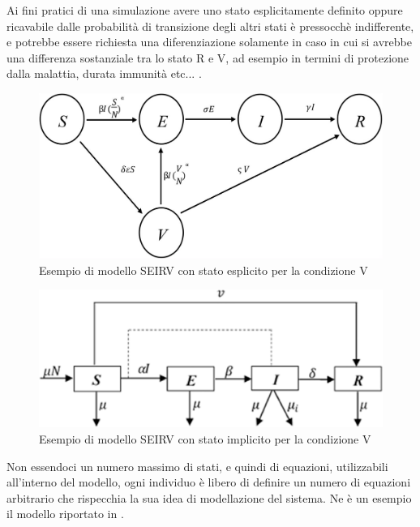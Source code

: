 Ai fini pratici di una simulazione avere uno stato esplicitamente definito
oppure ricavabile dalle probabilità di transizione degli altri stati 
è pressocchè indifferente, e potrebbe essere richiesta una diferenziazione
solamente in caso in cui si avrebbe una differenza sostanziale tra lo stato
R e V, ad esempio in termini di protezione dalla malattia, durata immunità etc... .

\begin{figure}[h]
    \begin{center}
        \includegraphics[scale=1.2]{img/seirv_explicit.jpg}
        \caption{Esempio di modello SEIRV con stato esplicito per la condizione V}
        \label{fig:SEIRV_explicit}
    \end{center}
\end{figure}

\begin{figure}[h]
    \begin{center}
        \includegraphics[scale=1.3]{img/seirv_implicit.jpg}
        \caption{Esempio di modello SEIRV con stato implicito per la condizione V}
        \label{fig:SEIRV_implicito}
    \end{center}
\end{figure}

Non essendoci un numero massimo di stati, e quindi di equazioni, utilizzabili
all'interno del modello, ogni individuo è libero di definire un numero
di equazioni arbitrario che rispecchia la sua idea di modellazione del 
sistema. Ne è un esempio il modello riportato in \cite{Giordano2020}.

